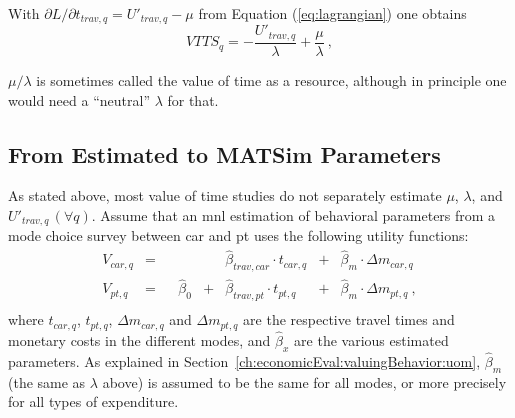 With $\partial L / \partial t_{trav,q} = U'_{trav,q} - \mu$ from Equation (\ref{eq:lagrangian}) one obtains
\begin{equation}
VTTS_q 
= - \frac{U'_{trav,q}}{\lambda} + \frac{\mu}{\lambda} \ ,
\label{eq:vot2}
\end{equation}

$\mu/\lambda$ is sometimes called the value of time as a resource, although in principle one would need a ``neutral'' $\lambda$ for that.




\subsection{From Estimated to MATSim Parameters}
\label{ch:economicEval:valuingBehavior:estimates2Matsim}

As stated above, most value of time studies do not separately estimate $\mu$, $\lambda$, and $U'_{trav,q} \, (\forall q)$. 
%
Assume that an \gls{mnl} estimation of behavioral parameters from a mode choice survey between car and \gls{pt} uses the following utility functions:
%
\begin{equation}
\begin{matrix}
V_{car,q} & =
&   &
&   & \hat{\beta}_{trav,car} \cdot t_{car,q}
& + & \hat{\beta}_{m} \cdot  \Delta{m_{car,q}} \\
%
V_{pt,q} & = 
&   & \hat{\beta}_{0}
& + & \hat{\beta}_{trav,pt} \cdot t_{pt,q}
& + & \hat{\beta}_{m} \cdot  \Delta{m_{pt,q}}  \ , \\
\end{matrix}
\label{eq:ch:economicEval:utilityTraveling}
\end{equation}
%
where $t_{car,q}$, $t_{pt,q}$, $\Delta{m_{car,q}}$ and $\Delta{m_{pt,q}}$  are the respective travel times and monetary costs in the different modes, and $\hat\beta_x$ are the various estimated parameters.
%
As explained in Section~\ref{ch:economicEval:valuingBehavior:uom}, $\hat\beta_m$ (the same as $\lambda$ above) is assumed to be the same for all modes, or more precisely for all types of expenditure.

